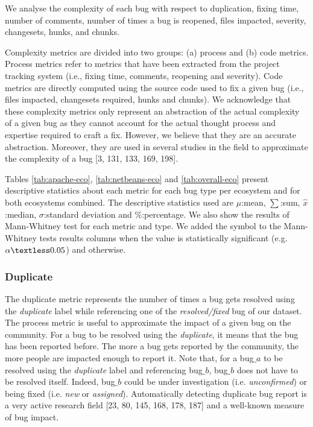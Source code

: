 \documentclass[12pt]{report}
\newcommand{\xmark}{\ding{55}}%
\begin{document}
We analyse the complexity of each bug with respect to duplication,
fixing time, number of comments, number of times a bug is reopened,
files impacted, severity, changesets, hunks, and chunks.

Complexity metrics are divided into two groups: (a) process and (b) code
metrics. Process metrics refer to metrics that have been extracted from
the project tracking system (i.e., fixing time, comments, reopening and
severity). Code metrics are directly computed using the source code used
to fix a given bug (i.e., files impacted, changesets required, hunks and
chunks). We acknowledge that these complexity metrics only represent an
abstraction of the actual complexity of a given bug as they cannot
account for the actual thought process and expertise required to craft a
fix. However, we believe that they are an accurate abstraction.
Moreover, they are used in several studies in the field to approximate
the complexity of a bug {[}3, 131, 133, 169, 198{]}.

Tables \ref{tab:apache-eco}, \ref{tab:netbeans-eco} and
\ref{tab:overall-eco} present descriptive statistics about each metric
for each bug type per ecosystem and for both ecosystems combined. The
descriptive statistics used are \(\mu\):mean, \(\sum\):sum,
\(\hat{x}\):median, \(\sigma\):standard deviation and \(\%\):percentage.
We also show the results of Mann-Whitney test for each metric and type.
We added the \checkmark symbol to the Mann-Whitney tests results columns
when the value is statistically significant (e.g.
\(\alpha \textless 0.05\)) and \xmark otherwise.

 


\subsubsection{Duplicate}\label{duplicate}

The duplicate metric represents the number of times a bug gets resolved
using the \emph{duplicate} label while referencing one of the
\emph{resolved/fixed} bug of our dataset. The process metric is useful
to approximate the impact of a given bug on the community. For a bug to
be resolved using the \emph{duplicate}, it means that the bug has been
reported before. The more a bug gets reported by the community, the more
people are impacted enough to report it. Note that, for a bug\(\_a\) to
be resolved using the \emph{duplicate} label and referencing bug\(\_b\),
bug\(\_b\) does not have to be resolved itself. Indeed, bug\(\_b\) could
be under investigation (i.e. \emph{unconfirmed}) or being fixed (i.e.
\emph{new} or \emph{assigned}). Automatically detecting duplicate bug
report is a very active research field {[}23, 80, 145, 168, 178, 187{]}
and a well-known measure of bug impact.
\end{document}
